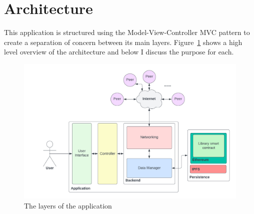 \section{Architecture}

This application is structured using the Model-View-Controller MVC pattern to create a separation of concern between its main layers. Figure~\ref{fig:impl-layers} shows a high level overview of the architecture and below I discuss the purpose for each.

\begin{figure}[H]
  \centering
  \includegraphics[width=.8\textwidth]{assets/images/diagrams/layers.png}
  \caption{The layers of the application}
  \label{fig:impl-layers}
\end{figure}







